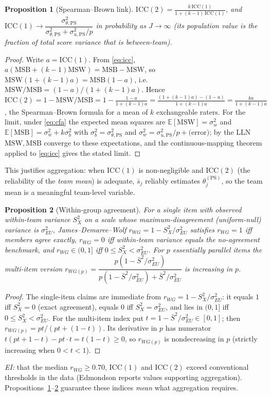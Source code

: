 \documentclass{amsart}
\newtheorem{proposition}{Proposition}
\theoremstyle{remark}
\begin{document}
\begin{proposition}[Spearman--Brown link]\label{prop:sb}
$\displaystyle \mathrm{ICC}(2)=\frac{k\,\mathrm{ICC}(1)}{1+(k-1)\,\mathrm{ICC}(1)}$,
and $\mathrm{ICC}(1)\to\dfrac{\sigma^2_{\theta,\mathrm{PS}}}
{\sigma^2_{\theta,\mathrm{PS}}+\sigma^2_{u,\mathrm{PS}}/p}$ in probability as
$J\to\infty$ (its population value is the fraction of total score variance that is
between-team).
\end{proposition}
\begin{proof}
Write $a=\mathrm{ICC}(1)$. From \eqref{eq:icc}, $a(\mathrm{MSB}+(k-1)\mathrm{MSW})=\mathrm{MSB}-\mathrm{MSW}$,
so $\mathrm{MSW}(1+(k-1)a)=\mathrm{MSB}(1-a)$, i.e.\
$\mathrm{MSW}/\mathrm{MSB}=(1-a)/(1+(k-1)a)$. Hence
$\mathrm{ICC}(2)=1-\mathrm{MSW}/\mathrm{MSB}=1-\frac{1-a}{1+(k-1)a}
=\frac{(1+(k-1)a)-(1-a)}{1+(k-1)a}=\frac{ka}{1+(k-1)a}$,
the Spearman--Brown formula for a mean of $k$ exchangeable raters. For the limit,
under \eqref{eq:cfa} the expected mean squares are
$\mathbb{E}[\mathrm{MSW}]=\sigma^2_w$ and
$\mathbb{E}[\mathrm{MSB}]=\sigma^2_w+k\sigma^2_b$ with
$\sigma^2_b=\sigma^2_{\theta,\mathrm{PS}}$ and
$\sigma^2_w=\sigma^2_{u,\mathrm{PS}}/p+\text{(error)}$; by the LLN
$\mathrm{MSW},\mathrm{MSB}$ converge to these expectations, and the continuous-mapping
theorem applied to \eqref{eq:icc} gives the stated limit. \end{proof}

This justifies aggregation: when $\mathrm{ICC}(1)$ is non-negligible and
$\mathrm{ICC}(2)$ (the reliability of the \emph{team mean}) is adequate, $\bar s_j$
reliably estimates $\theta^{(\mathrm{PS})}_j$, so the team mean is a meaningful
team-level variable.

\begin{proposition}[Within-group agreement]\label{prop:rwg}
For a single item with observed within-team variance $S_X^2$ on a scale whose
maximum-disagreement (uniform-null) variance is $\sigma^2_{EU}$, James--Demaree--Wolf
$r_{WG}=1-S_X^2/\sigma^2_{EU}$ satisfies $r_{WG}=1$ iff members agree exactly,
$r_{WG}=0$ iff within-team variance equals the no-agreement benchmark, and
$r_{WG}\in(0,1]$ iff $0\le S_X^2<\sigma^2_{EU}$. For $p$ essentially parallel items
the multi-item version
$r_{WG(p)}=\dfrac{p(1-\bar S^2/\sigma^2_{EU})}{p(1-\bar S^2/\sigma^2_{EU})+\bar S^2/\sigma^2_{EU}}$
is increasing in $p$.
\end{proposition}
\begin{proof}
The single-item claims are immediate from $r_{WG}=1-S_X^2/\sigma^2_{EU}$: it equals
$1$ iff $S_X^2=0$ (exact agreement), equals $0$ iff $S_X^2=\sigma^2_{EU}$, and lies
in $(0,1]$ iff $0\le S_X^2<\sigma^2_{EU}$. For the multi-item index put
$t=1-\bar S^2/\sigma^2_{EU}\in[0,1]$; then $r_{WG(p)}=pt/(pt+(1-t))$. Its derivative
in $p$ has numerator $t(pt+1-t)-pt\cdot t=t(1-t)\ge0$, so $r_{WG(p)}$ is
nondecreasing in $p$ (strictly increasing when $0<t<1$). \end{proof}
\emph{EI:} that the median $r_{WG}\ge 0.70$, $\mathrm{ICC}(1)$ and $\mathrm{ICC}(2)$
exceed conventional thresholds in the data (Edmondson reports values supporting
aggregation). Propositions~\ref{prop:sb}--\ref{prop:rwg} guarantee these indices
\emph{mean} what aggregation requires.
\end{document}
